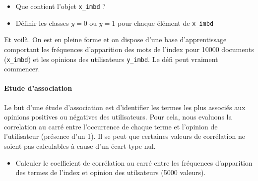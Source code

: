 \documentclass[]{article}
\newenvironment{Shaded}{\begin{snugshade}}{\end{snugshade}}
\newcommand{\KeywordTok}[1]{\textcolor[rgb]{0.13,0.29,0.53}{\textbf{#1}}}
\newcommand{\DecValTok}[1]{\textcolor[rgb]{0.00,0.00,0.81}{#1}}
\newcommand{\StringTok}[1]{\textcolor[rgb]{0.31,0.60,0.02}{#1}}
\newcommand{\CommentTok}[1]{\textcolor[rgb]{0.56,0.35,0.01}{\textit{#1}}}
\newcommand{\ControlFlowTok}[1]{\textcolor[rgb]{0.13,0.29,0.53}{\textbf{#1}}}
\newcommand{\OperatorTok}[1]{\textcolor[rgb]{0.81,0.36,0.00}{\textbf{#1}}}
\newcommand{\NormalTok}[1]{#1}
\providecommand{\tightlist}{%
  \setlength{\itemsep}{0pt}\setlength{\parskip}{0pt}}
\let\oldparagraph\paragraph
\renewcommand{\paragraph}[1]{\oldparagraph{#1}\mbox{}}
\begin{document}
\begin{Shaded}
\begin{Highlighting}[]
{        \ControlFlowTok{if}\NormalTok{ (j}\OperatorTok{%%}\DecValTok{500} \OperatorTok{==}\StringTok{ }\DecValTok{0}\NormalTok{) }\KeywordTok{print}\NormalTok{(j) }\CommentTok{# ca rassure}
\NormalTok{    \}}
\NormalTok{    x_imbd <-}\StringTok{ }\KeywordTok{rbind}\NormalTok{(x_imbd, x_imbd_}\DecValTok{500}\NormalTok{)}
\NormalTok{  \}}
\end{Highlighting}
\end{Shaded}

\begin{itemize}
\item
  Que contient l'objet \texttt{x\_imbd} ?
\item
  Définir les classes \(y = 0\) ou \(y=1\) pour chaque élément de
  \texttt{x\_imbd}
\end{itemize}

\begin{Shaded}
\end{Shaded}

Et voilà. On est en pleine forme et on dispose d'une base
d'apprentissage comportant les fréquences d'apparition des mots de
l'index pour 10000 documents (\texttt{x\_imbd}) et les opinions des
utilisateurs \texttt{y\_imbd}. Le défi peut vraiment commencer.

\paragraph{Etude d'association}\label{etude-dassociation}

Le but d'une étude d'association est d'identifier les termes les plus
associés aux opinions positives ou négatives des utilisateurs. Pour
cela, nous evaluons la correlation au carré entre l'occurrence de chaque
terme et l'opinion de l'utilisateur (présence d'un 1). Il se peut que
certaines valeurs de corrélation ne soient pas calculables à cause d'un
écart-type nul.

\begin{itemize}
\tightlist
\item
  Calculer le coefficient de corrélation au carré entre les fréquences
  d'apparition des termes de l'index et opinion des utilsateurs (5000
  valeurs).
\end{itemize}
\end{document}
